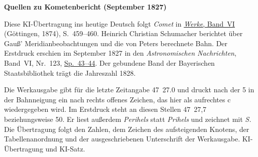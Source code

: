 \clearpage\thispagestyle{empty}
\begin{center}\textbf{Quellen zu Kometenbericht (September 1827)}\end{center}
\noindent Diese KI-Übertragung ins heutige Deutsch folgt \textit{Comet} in \href{https://gdz.sub.uni-goettingen.de/id/PPN236007467}{\textit{Werke}, Band~VI} (Göttingen, 1874), S.~459--460. Heinrich Christian Schumacher berichtet über Gauß’ Meridianbeobachtungen und die von Peters berechnete Bahn. Der Erstdruck erschien im September 1827 in den \textit{Astronomischen Nachrichten}, Band~VI, Nr.~123, \href{https://api.digitale-sammlungen.de/iiif/image/v2/bsb10049431_00038/full/1550,/0/default.jpg}{Sp.~43--44}. Der gebundene Band der Bayerischen Staatsbibliothek trägt die Jahreszahl 1828.
\par\smallskip\noindent Die Werkausgabe gibt für die letzte Zeitangabe 47~27.0 und druckt nach der 5 in der Bahnneigung ein nach rechts offenes Zeichen, das hier als aufrechtes \textup{c} wiedergegeben wird. Im Erstdruck steht an diesen Stellen 47~27,7 beziehungsweise 50. Er liest außerdem \textit{Perihels} statt \textit{Prihels} und zeichnet mit \textit{S.} Die Übertragung folgt den Zahlen, dem Zeichen des aufsteigenden Knotens, der Tabellenanordnung und der ausgeschriebenen Unterschrift der Werkausgabe. KI-Übertragung und KI-Satz.
\clearpage
